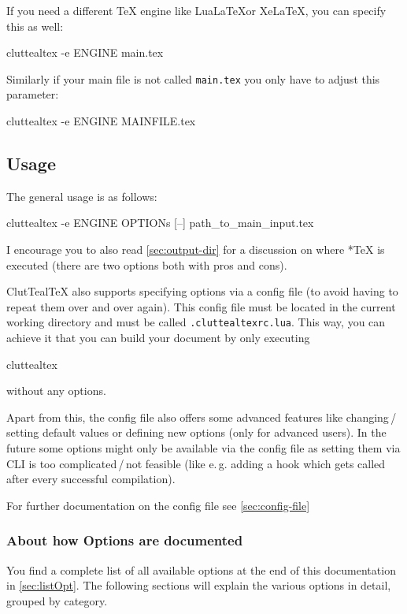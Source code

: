 \documentclass[a4paper, 11pt]{scrartcl}
\newcommand\eg{e.\,g.\xspace}
\let\TeXold\TeX
\newcommand\CluttealTeX{ClutTeal\TeX\xspace}
\renewcommand\TeX{\TeXold\xspace}
\begin{document}
If you need a different \TeX engine like Lua\LaTeX or Xe\LaTeX, you can specify this as well:
\begin{boxcode}[none][\normalsize]
  cluttealtex -e ENGINE main.tex
\end{boxcode}

Similarly if your main file is not called \texttt{main.tex} you only have to adjust this parameter:
\begin{boxcode}[none][\normalsize]
  cluttealtex -e ENGINE MAINFILE.tex
\end{boxcode}

\subsection{Usage}
The general usage is as follows:
\begin{boxcode}[none][\normalsize]
cluttealtex -e ENGINE OPTIONs [--] path_to_main_input.tex
\end{boxcode}

I encourage you to also read \cref{sec:output-dir} for a discussion on where *\TeX is executed (there are two options both with pros and cons).

\CluttealTeX also supports specifying options via a config file (to avoid having to repeat them over and over again).
This config file must be located in the current working directory and must be called \texttt{.cluttealtexrc.lua}.
This way, you can achieve it that you can build your document by only executing
\begin{boxcode}[none][\normalsize]
	cluttealtex
\end{boxcode}
without any options.

Apart from this, the config file also offers some advanced features like changing\,/\,setting default values or defining new options (only for advanced users).
In the future some options might only be available via the config file as setting them via CLI is too complicated\,/\,not feasible (like \eg adding a hook which gets called after every successful compilation).

For further documentation on the config file see \cref{sec:config-file}

\subsubsection{About how Options are documented} \label{sec:opt-doc}

You find a complete list of all available options at the end of this documentation in \cref{sec:listOpt}.
The following sections will explain the various options in detail, grouped by category.
\end{document}
